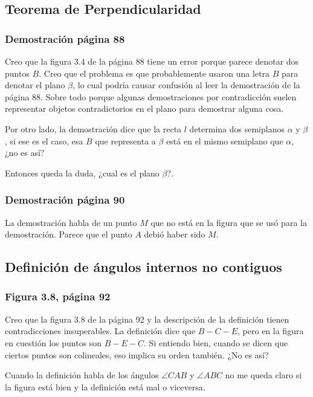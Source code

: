 \subsection{Teorema de Perpendicularidad}
\subsubsection{Demostración página 88}

Creo que la figura 3.4 de la página 88 tiene un error porque parece denotar dos puntos \(B\). Creo que el problema es que probablemente usaron una letra \(B\) para denotar el plano \(\beta\), lo cual podría causar confusión al leer la demostración de la página 88. Sobre todo porque algunas demostraciones por contradicción suelen representar objetos contradictorios en el plano para demostrar alguna cosa.

Por otro lado, la demostración dice que la recta \(l\) determina dos semiplanos \(\alpha\) y \(\beta\), si ese es el caso, esa \(B\) que representa a \(\beta\) está en el mismo semiplano que \(\alpha\), ¿no es así?

Entonces queda la duda, ¿cual es el plano \(\beta\)?.

\subsubsection{Demostración página 90}

La demostración habla de un punto \(M\) que no está en la figura que se usó para la demostración. Parece que el punto \(A\) debió haber sido \(M\).


\subsection{Definición de ángulos internos no contiguos}
\subsubsection{Figura 3.8, página 92}

Creo que la figura 3.8 de la página 92 y la descripción de la definición tienen contradicciones insuperables. La definición dice que \(B-C-E\), pero en la figura en cuestión los puntos son \(B-E-C\).  Si entiendo bien, cuando se dicen que ciertos puntos son colineales, eso implica su orden también. ¿No es así?

Cuando la definición habla de los ángulos \(\angle{CAB}\) y \(\angle{ABC}\) no me queda claro si la figura está bien y la definición está mal o viceversa. 

